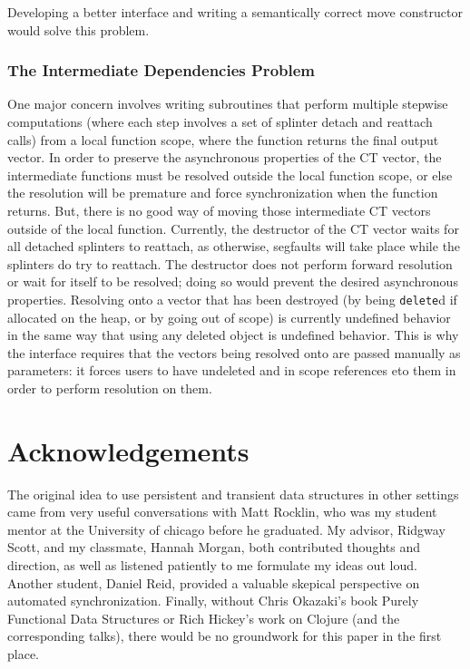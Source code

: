 \documentclass[pageno]{jpaper}
\begin{document}
Developing a better interface and writing a semantically correct move
constructor would solve this problem.

\subsubsection{The Intermediate Dependencies Problem}
One major concern involves
writing subroutines that perform multiple stepwise computations (where each step
involves a set of splinter detach and reattach calls) from a local function
scope, where the function returns the final output vector. In order to preserve
the asynchronous properties of the CT vector, the intermediate functions must
be resolved outside the local function scope, or else the resolution will be
premature and force synchronization when the function returns. But, there is no
good way of moving those intermediate CT vectors outside of the local function.
Currently, the destructor of the CT vector waits for all detached splinters to
reattach, as otherwise, segfaults will take place while the splinters do try to
reattach. The destructor does not perform forward resolution or wait for itself
to be resolved; doing so would prevent the desired asynchronous properties.
Resolving onto a vector that has been destroyed (by being \texttt{delete}d if
allocated on the heap, or by going out of scope) is currently undefined behavior
in the same way that using any deleted object is undefined behavior. This is why
the interface requires that the vectors being resolved onto are passed manually
as parameters: it forces users to have undeleted and in scope references eto
them in order to perform resolution on them.

\section{Acknowledgements}
The original idea to use persistent and transient data structures in other
settings came from very useful conversations with Matt Rocklin, who was my
student mentor at the University of chicago before he graduated. My advisor,
Ridgway Scott, and my classmate, Hannah Morgan, both contributed thoughts and
direction, as well as listened patiently to me formulate my ideas out loud.
Another student, Daniel Reid, provided a valuable skepical perspective on
automated synchronization. Finally, without Chris Okazaki's book Purely
Functional Data Structures or Rich Hickey's work on Clojure (and the
corresponding talks), there would be no groundwork for this paper in the first
place.



\end{document}
